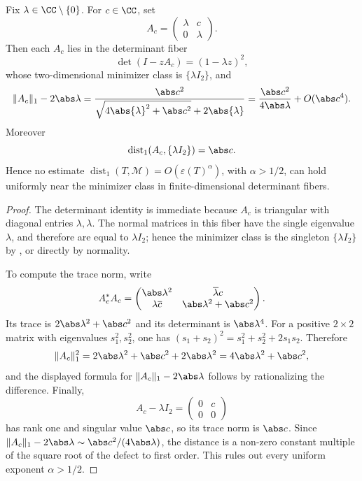 \begin{proposition}
  \label{prop:two-by-two-square-root-sharpness}
  Fix \(\lambda\in\CC\setminus\{0\}\). For \(c\in\CC\), set
  \[
    A_c=\begin{pmatrix}\lambda&c\\0&\lambda\end{pmatrix}.
  \]
  Then each \(A_c\) lies in the determinant fiber
  \[
    \det(I-zA_c)=(1-\lambda z)^2,
  \]
  whose two-dimensional minimizer class is \(\{\lambda I_2\}\), and
  \[
    \|A_c\|_1-2\abs\lambda
    =
    \frac{\abs c^2}
    {\sqrt{4\abs{\lambda}^2+\abs c^2}+2\abs{\lambda}}
    =\frac{\abs c^2}{4\abs\lambda}+O(\abs c^4).
  \]
  Moreover
  \[
    \operatorname{dist}_1(A_c,\{\lambda I_2\})=\abs c.
  \]
  Hence no estimate
  \(\operatorname{dist}_1(T,\mathcal M)=O(\varepsilon(T)^\alpha)\),
  with \(\alpha>1/2\), can hold uniformly near the minimizer class in
  finite-dimensional determinant fibers.
\end{proposition}

\begin{proof}
  The determinant identity is immediate because \(A_c\) is triangular with
  diagonal entries \(\lambda,\lambda\). The normal matrices in this fiber
  have the single eigenvalue \(\lambda\), and therefore are equal to
  \(\lambda I_2\); hence the minimizer class is the singleton
  \(\{\lambda I_2\}\) by
  , or directly by normality.

  To compute the trace norm, write
  \[
    A_c^*A_c=
    \begin{pmatrix}
      \abs\lambda^2 & \overline\lambda c\\
      \lambda\overline c & \abs\lambda^2+\abs c^2
    \end{pmatrix}.
  \]
  Its trace is \(2\abs\lambda^2+\abs c^2\) and its determinant is
  \(\abs\lambda^4\). For a positive \(2\times2\) matrix with eigenvalues
  \(s_1^2,s_2^2\), one has
  \((s_1+s_2)^2=s_1^2+s_2^2+2s_1s_2\). Therefore
  \[
    \|A_c\|_1^2
    =2\abs\lambda^2+\abs c^2+2\abs\lambda^2
    =4\abs\lambda^2+\abs c^2,
  \]
  and the displayed formula for \(\|A_c\|_1-2\abs\lambda\) follows by
  rationalizing the difference. Finally,
  \[
    A_c-\lambda I_2=\begin{pmatrix}0&c\\0&0\end{pmatrix}
  \]
  has rank one and singular value \(\abs c\), so its trace norm is
  \(\abs c\). Since
  \(\|A_c\|_1-2\abs\lambda\sim \abs c^2/(4\abs\lambda)\), the distance is
  a non-zero constant multiple of the square root of the defect to first
  order. This rules out every uniform exponent \(\alpha>1/2\).
\end{proof}

